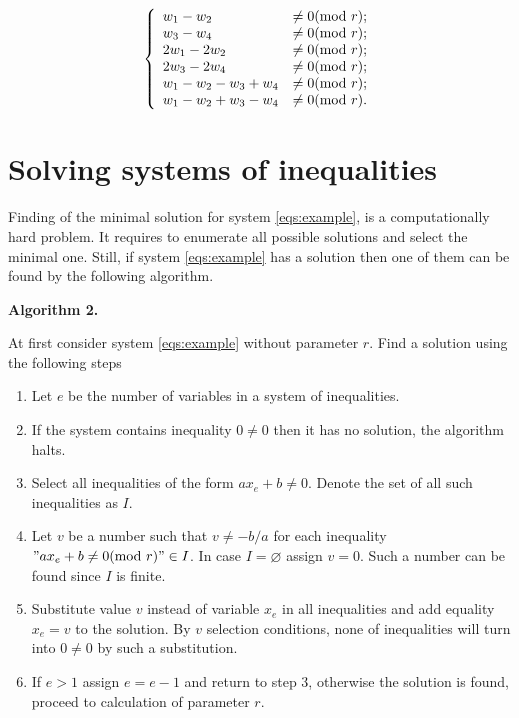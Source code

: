 \documentclass[a4paper,fleqn]{cas-sc}
\begin{document}
\begin{equation}
    \centering
    \left\{
        \begin{array}{ll}
            w_1 - w_2 &\neq 0             (\mod{r}) ; \\
            w_3 - w_4 &\neq 0             (\mod{r}) ; \\
            2 w_1 - 2 w_2 &\neq 0         (\mod{r}) ; \\
            2 w_3 - 2 w_4 &\neq 0         (\mod{r}) ; \\
            w_1 - w_2 - w_3 + w_4 &\neq 0 (\mod{r}) ; \\
            w_1 - w_2 + w_3 - w_4 &\neq 0 (\mod{r}) . \\
        \end{array}
        \label{eqs:cycle_search_neqs}
    \right.
\end{equation}

\section{Solving systems of inequalities}


Finding of the minimal solution for system \eqref{eqs:example}, is a computationally hard problem. It requires to enumerate all possible solutions and select the minimal one. Still, if system \eqref{eqs:example} has a solution then one of them can be found by the following algorithm.

\textbf{Algorithm 2.}

At first consider system \eqref{eqs:example} without parameter $r$. Find a solution using the following steps

\begin{enumerate}
    \item Let $e$ be the number of variables in a system of inequalities.
    \item If the system contains inequality $0 \neq 0$ then it has no solution, the algorithm halts.
    \item Select all inequalities of the form $a x_e + b \neq 0$. Denote the set of all such inequalities as $I$.
    \item Let $v$ be a number such that $v \neq -b/a $ for each inequality $"a x_e + b \neq 0 (\mod{r})" \in I$. In case $I = \varnothing$ assign $v = 0$. Such a number can be found since $I$ is finite.
    \item Substitute value $v$ instead of variable $x_e$ in all inequalities and add equality $x_e = v$ to the solution. By $v$ selection conditions, none of inequalities will turn into $0 \neq 0$ by such a substitution. 
    \item If $e > 1$ assign $e = e - 1$ and return to step 3, otherwise the solution is found, proceed to calculation of parameter $r$.
\end{enumerate}
\end{document}
